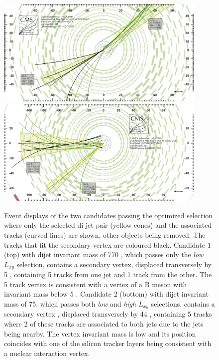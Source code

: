 \begin{figure}
\centering
\includegraphics[width=0.9\textwidth]{plots/displays/candidate1_display.png}
\includegraphics[width=0.9\textwidth]{plots/displays/candidate2_display.png}

\caption{Event displays of the two candidates passing the optimized selection where only the selected di-jet pair
 (yellow cones) and 
the associated tracks (curved lines) are shown, other objects being removed. The tracks that fit the secondary 
vertex are coloured black.  
Candidate 1 (top) with dijet invariant mass of 770 \GeV, which 
passes only the {\it low $L_{xy}$} selection, 
contains a secondary vertex, displaced transversely by 5 \cm, containing 5 tracks from one jet and 1 track
from the other. The 5 track vertex is consistent with a vertex of a B meson with invariant mass below 5 \GeV.
Candidate 2 (bottom) with dijet invariant mass of 75\GeV, 
which passes both {\it low} and {\it high $L_{xy}$} selections, contains a secondary vertex
, displaced transversely by 44 \cm, containing 5 tracks where 2 of these tracks are
associated to both jets due to the jets being nearby. The vertex invariant mass is low and its position
 coincides with one of the silicon 
tracker layers being consistent with a nuclear interaction vertex. \label{fig:eventDisplays}}
\end{figure} 



